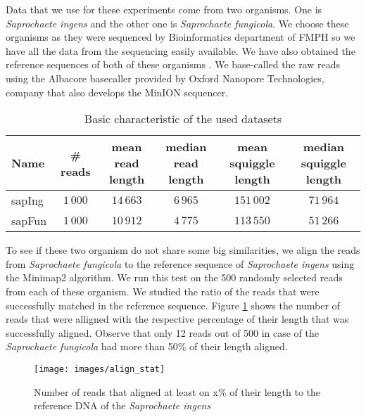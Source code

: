 Data that we use for these experiments come from two organisms. One is \emph{Saprochaete ingens} and
the other one is \emph{Saprochaete fungicola}. We choose these
organisms as they were sequenced by Bioinformatics department of
FMPH so we have all the data from the sequencing easily available.
We have also obtained the reference sequences of both of these organisms \cite{hodorova2019genome} \cite{brejova2019genome}.
We base-called the raw reads using the Albacore basecaller provided by Oxford Nanopore Technologies, company that also develops the MinION sequencer.

\begin{table}
\caption[TODO]{Basic characteristic of the used datasets}
\label{tab:datasetChar}
\begin{center}
\begin{tabular}{lccccc}
\hline 
Name & \# reads & \specialcell{mean read\\length} & \specialcell{median read\\length} & \specialcell{mean squiggle\\length} &  \specialcell{median squiggle\\length}\\
\hline
sapIng & $1\,000$ & $14\,663$ & $6\,965$ & $151\,002$ & $71\,964$ \\
sapFun & $1\,000$ & $10\,912$ & $4\,775$ & $113\,550$ & $51\,266$ \\
\hline
\end{tabular}
\end{center}
\end{table}

To see if these two organism do not share some big similarities, we align the reads from
\emph{Saprochaete fungicola} to the reference sequence of \emph{Saprochaete ingens} using the Minimap2
algorithm. We run this test on the 500 randomly selected reads from each of these organism. We studied
the ratio of the reads that were successfully matched in the reference sequence. Figure \ref{obr:align_stat}
shows the number of reads that were alligned with the respective percentage of their length that was successfully aligned.
Observe that only 12 reads out of 500 in case of the \emph{Saprochaete fungicola} had more than 50\% of their length aligned.

\begin{figure}
\centerline{\texttt{[image: images/align\_stat]}}
\caption[TODO]{Number of reads that aligned at least on x\% of their length to the reference DNA of the \emph{Saprochaete ingens}}
\label{obr:align_stat}
\end{figure}

